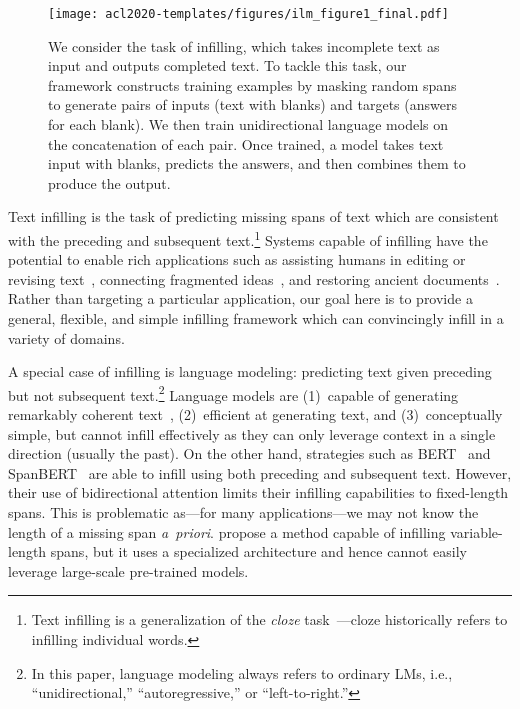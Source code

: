 \begin{figure}[t!]
    \centering
    \texttt{[image: acl2020-templates/figures/ilm\_figure1\_final.pdf]}
    \caption{
    We consider the task of infilling, which takes incomplete text as input and outputs completed text.
    To tackle this task, our framework constructs training examples by masking random spans to generate pairs of inputs (text with blanks) and targets (answers for each blank). 
    We then train unidirectional language models on the concatenation of each pair.
    Once trained, a model takes text input with blanks, predicts the answers, and then combines them to produce the output.
    }
    \label{fig:infilling_training_example}
    \vspace{-5mm}
\end{figure}

Text infilling is the task of predicting missing spans of text which are consistent with the preceding and subsequent text.\footnote{Text infilling is a generalization of the \emph{cloze} task~\citep{taylor1953cloze}---cloze historically refers to infilling individual words.} 
Systems capable of infilling have the potential to enable rich applications such as assisting humans in
editing or revising text~\citep{shih2019xl}, 
connecting fragmented ideas~\citep{ai2019haim}, 
and restoring ancient documents~\citep{assael2019restoring}. 
Rather than targeting a particular application, our goal here is to provide a general, flexible, and simple infilling framework which can convincingly infill in a variety of domains.

A special case of infilling is language modeling: 
predicting text given preceding but not subsequent text.\footnote{In this paper, language modeling always refers to ordinary LMs, i.e., ``unidirectional,'' ``autoregressive,'' or ``left-to-right.''}
Language models are 
(1)~capable of generating remarkably coherent text~\citep{zellers2019defending,see2019massively},
(2)~efficient at generating text, 
and 
(3)~conceptually simple, 
but cannot infill effectively as they can only leverage context in a single direction (usually the past).
On the other hand, 
strategies such as BERT~\citep{devlin2019bert} and SpanBERT~\citep{joshi2019spanbert} are able to infill using both preceding and subsequent text. 
However, their use of bidirectional attention limits their infilling capabilities to fixed-length spans. 
This is problematic as---for many applications---we may not know the length of a missing span \emph{a~priori}. 
\citet{zhu2019text} propose a method capable of infilling variable-length spans, but it uses a specialized architecture and hence cannot easily leverage large-scale pre-trained models.

